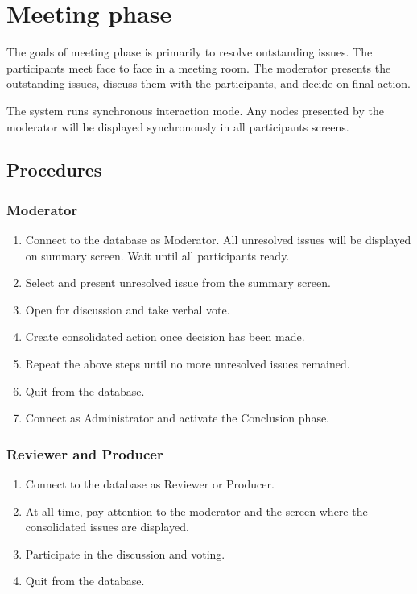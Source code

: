 \section {Meeting phase}
The goals of meeting phase  is primarily to resolve outstanding issues.
The participants meet face to face in a meeting room. The moderator
presents the outstanding issues, discuss them with the 
participants, and decide on final action.

The system runs synchronous interaction mode. Any nodes presented by
the moderator will be displayed synchronously in all participants
screens. 

\subsection {Procedures}
\subsubsection*{Moderator}
\begin{enumerate}
\item Connect to the database as Moderator. All unresolved issues will
be displayed on summary screen.
Wait until all participants ready. 
\item Select and present unresolved issue from the summary screen.
\item Open for discussion and take verbal vote.
\item Create consolidated action once decision has been made.
\item Repeat the above steps until no more unresolved issues remained.
\item Quit from the database.
\item Connect as Administrator and activate the Conclusion phase.
\end{enumerate}

\subsubsection*{Reviewer and Producer}
\begin{enumerate}
\item Connect to the database as Reviewer or Producer.
\item At all time, pay attention to the moderator and the screen where
the consolidated issues are displayed.
\item Participate in the discussion and voting.
\item Quit from the database.
\end{enumerate}

